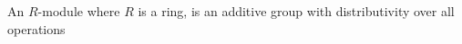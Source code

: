 \begin{ddef}[Modules]
An $R$-module where $R$ is a ring, is an additive group with distributivity over all operations
\end{ddef}

